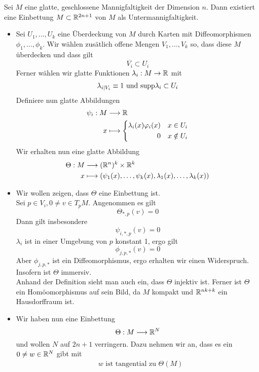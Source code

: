 Sei $M$ eine glatte, geschlossene Mannigfaltigkeit der Dimension $n$. Dann existiert eine Einbettung $M \subset \mathbb{R}^{2n+1}$ von $M$ als Untermannigfaltigkeit.
\begin{Beweis}{}
\begin{itemize}
	\item Sei $U_1, \ldots, U_k$ eine Überdeckung von $M$ durch Karten mit Diffeomorphismen $\phi_1,\ldots, \phi_k$. Wir wählen zusätlich offene Mengen $V_1,\ldots, V_k$ so, dass diese $M$ überdecken und dass gilt
	\[ \overline{V_i} \subset U_i \]
	Ferner wählen wir glatte Funktionen $\lambda_i : M \overset{}{\rightarrow} \mathbb{R}$ mit
	\begin{align*}
	\lambda_{i|V_i} \equiv 1 \text{  und  } \text{supp} \lambda_i \subset U_i
	\end{align*}
	Definiere nun glatte Abbildungen
	\begin{align*}
	\psi_i : M & \overset{}{\longrightarrow} \mathbb{R}\\
	x &\longmapsto \left\lbrace
	\begin{aligned}
	\lambda_i(x)\varphi_i(x) && x\in U_i\\
	0 && x \notin U_i
	\end{aligned}
	\right.
	\end{align*}
	Wir erhalten nun eine glatte Abbildung
	\begin{align*}
	\Theta : M &\overset{}{\longrightarrow} (\mathbb{R}^{n})^k \times \mathbb{R}^k\\
	x & \longmapsto (\psi_1(x), \ldots, \psi_k(x), \lambda_1(x), \ldots, \lambda_k(x))
	\end{align*}
	\item Wir wollen zeigen, dass $\Theta$ eine Einbettung ist.\\
	Sei $p \in V_i, 0\neq v \in T_pM$. Angenommen es gilt
	\[ \Theta_{*,p}(v) = 0 \]
	Dann gilt insbesondere
	\[ \psi_{i,*,p}(v) = 0 \]
	$\lambda_i$ ist in einer Umgebung von $p$ konstant 1, ergo gilt
	\[ \phi_{j,p,*}(v) = 0 \]
	Aber $\phi_{j,p,*}$ ist ein Diffeomorphismus, ergo erhalten wir einen Widerspruch. Insofern ist $\Theta$ immersiv.\\
	Anhand der Definition sieht man auch ein, dass $\Theta$ injektiv ist. Ferner ist $\Theta$ ein Homöomorphismus auf sein Bild, da $M$ kompakt und $\mathbb{R}^{nk + k}$ ein Hausdorffraum ist.
	\item Wir haben nun eine Einbettung
	\[ \Theta : M \overset{}{\longrightarrow} \mathbb{R}^N \]
	und wollen $N$ auf $2n+1$ verringern. Dazu nehmen wir an, dass es ein $0\neq w \in \mathbb{R}^N$ gibt mit
	\begin{align*}
	&w \text{ ist tangential zu } \Theta(M)\\

\end{align*}
\end{itemize}
\end{Beweis}

